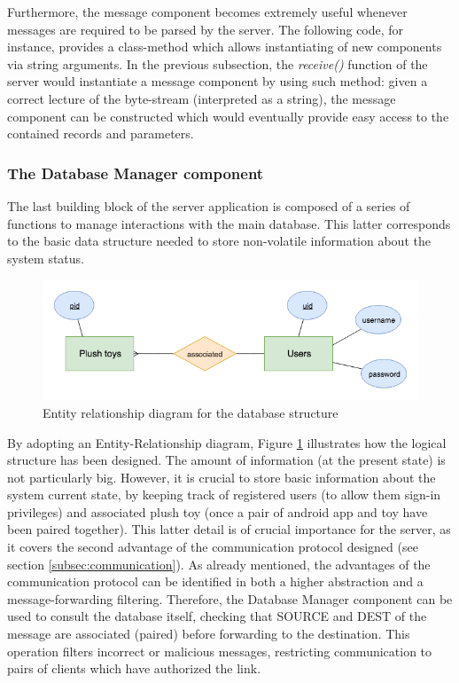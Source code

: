 \medskip
Furthermore, the message component becomes extremely useful whenever messages are required to be parsed by the server. The following code, for instance, provides a class-method which allows instantiating of new components via string arguments. In the previous subsection, the \textit{receive()} function of the server would instantiate a message component by using such method: given a correct lecture of the byte-stream (interpreted as a string), the message component can be constructed which would eventually provide easy access to the contained records and parameters.

\vspace{0.5cm}

\vspace{0.5cm}


\newpage
\subsubsection{The Database Manager component}
The last building block of the server application is composed of a series of functions to manage interactions with the main database. This latter corresponds to the basic data structure needed to store non-volatile information about the system status. 

\begin{figure}[ht]
    \centering
    \includegraphics[scale=0.7]{images/SE_ERdiag.png}
    \caption{Entity relationship diagram for the database structure}
    \label{fig:SE_ERdiag}
\end{figure}

By adopting an Entity-Relationship diagram, Figure \ref{fig:SE_ERdiag} illustrates how the logical structure has been designed. The amount of information (at the present state) is not particularly big. However, it is crucial to store basic information about the system current state, by keeping track of registered users (to allow them sign-in privileges) and associated plush toy (once a pair of android app and toy have been paired together). This latter detail is of crucial importance for the server, as it covers the second advantage of the communication protocol designed (see section \ref{subsec:communication}). As already mentioned, the advantages of the communication protocol can be identified in both a higher abstraction and a message-forwarding filtering. Therefore, the Database Manager component can be used to consult the database itself, checking that SOURCE and DEST of the message are associated (paired) before forwarding to the destination. This operation filters incorrect or malicious messages, restricting communication to pairs of clients which have authorized the link.

